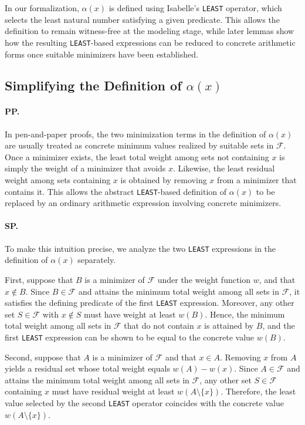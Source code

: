 \medskip

In our formalization, $\alpha(x)$ is defined using Isabelle's \texttt{LEAST} operator, which selects the least natural number satisfying a given predicate.
This allows the definition to remain witness-free at the modeling stage, while later lemmas show how the resulting \texttt{LEAST}-based expressions can be reduced to concrete arithmetic forms once suitable minimizers have been established.

\subsection{Simplifying the Definition of \texorpdfstring{$\alpha(x)$}{alpha(x)}}

\paragraph{PP.}
In pen-and-paper proofs, the two minimization terms in the definition of $\alpha(x)$ are usually treated as concrete minimum values realized by suitable sets in $\mathcal{F}$.
Once a minimizer exists, the least total weight among sets not containing $x$ is simply the weight of a minimizer that avoids $x$.
Likewise, the least residual weight among sets containing $x$ is obtained by removing $x$ from a minimizer that contains it.
This allows the abstract \texttt{LEAST}-based definition of $\alpha(x)$ to be replaced by an ordinary arithmetic expression involving concrete minimizers.

\paragraph{SP.}
To make this intuition precise, we analyze the two \texttt{LEAST} expressions in the definition of $\alpha(x)$ separately.

First, suppose that $B$ is a minimizer of $\mathcal{F}$ under the weight function $w$, and that $x \notin B$.
Since $B \in \mathcal{F}$ and attains the minimum total weight among all sets in $\mathcal{F}$, it satisfies the defining predicate of the first \texttt{LEAST} expression.
Moreover, any other set $S \in \mathcal{F}$ with $x \notin S$ must have weight at least $w(B)$.
Hence, the minimum total weight among all sets in $\mathcal{F}$ that do not contain $x$ is attained by $B$, and the first \texttt{LEAST} expression can be shown to be equal to the concrete value $w(B)$.

Second, suppose that $A$ is a minimizer of $\mathcal{F}$ and that $x \in A$.
Removing $x$ from $A$ yields a residual set whose total weight equals $w(A) - w(x)$.
Since $A \in \mathcal{F}$ and attains the minimum total weight among all sets in $\mathcal{F}$, any other set $S \in \mathcal{F}$ containing $x$ must have residual weight at least $w(A \setminus \{x\})$.
Therefore, the least value selected by the second \texttt{LEAST} operator coincides with the concrete value $w(A \setminus \{x\})$.

